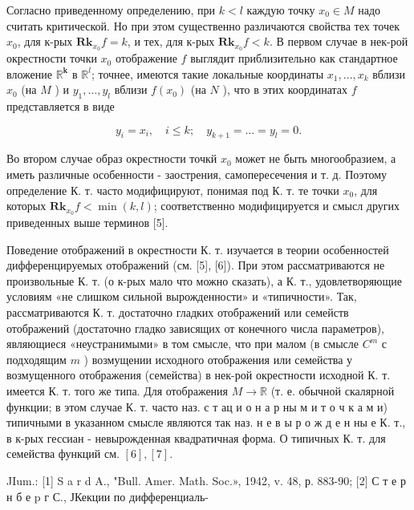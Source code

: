 \documentclass[10pt]{article}
\begin{document}
Согласно приведенному определению, при $k<l$ каждую точку $x_{0} \in M$ надо считать критической. Но при этом существенно различаются свойства тех точек $x_{0}$, для к-рых $\mathbf{R} \mathbf{k}_{x_{0}} f=k$, и тех, для к-рых $\mathbf{R} \mathbf{k}_{x_{0}} f<k$. В первом случае в нек-рой окрестности точки $x_{0}$ отображение $f$ выглядит приблизительно как стандартное вложение $\mathbb{R}^{\boldsymbol{k}}$ в $\mathbb{R}^{l}$; точнее, имеются такие локальные координаты $x_{1}, \ldots, x_{k}$ вблизи $x_{0}$ (на $M$ ) и $y_{1}, \ldots, y_{l}$ вблизи $f\left(x_{0}\right)$ (на $N$ ), что в этих координатах $f$ представляется в виде



\[

y_{i}=x_{i}, \quad i \leqslant k ; \quad y_{k+1}=\ldots=y_{l}=0 .

\]



Во втором случае образ окрестности точкй $x_{0}$ может не быть многообразием, а иметь различные особенности - заострения, самопересечения и т. д. Поэтому определение К. т. часто модифицируют, понимая под К. т. те точки $x_{0}$, для которых $\mathbf{R k}_{x_{0}} f<\min (k, l)$; соответственно модифицируется и смысл других приведенных выше терминов [5].



Поведение отображений в окрестности К. т. изучается в теории особенностей дифференцируемых отображений (см. [5], [6]). При этом рассматриваются не произвольные К. т. (о к-рых мало что можно сказать), а К. т., удовлетворяющие условиям «не слишком сильной вырожденности» и «типичности». Так, рассматриваются К. т. достаточно гладких отображений или семейств отображений (достаточно гладко зависящих от конечного числа параметров), являющиеся «неустранимыми» в том смысле, что при малом (в смысле $C^{m}$ с подходящим $m$ ) возмущении исходного отображения или семейства у возмущенного отображения (семейства) в нек-рой окрестности исходной К. т. имеется К. т. того же типа. Для отображения $M \rightarrow \mathbb{R}$ (т. е. обычной скалярной функции; в этом случае К. т. часто наз. с т ац и о н а р ны м и т о ч к а м и) типичными в указанном смысле являются так наз. н е в ы р о ж д е н ны е К. т., в к-рых гессиан - невырожденная квадратичная форма. О типичных К. т. для семейства функций см. $[6],[7]$.



JIum.: [1] S a r d A., "Bull. Amer. Math. Soc.», 1942, v. 48, р. 883-90; [2] С т е р н б е p г С., ЈКекции по дифференциаль-
\end{document}

